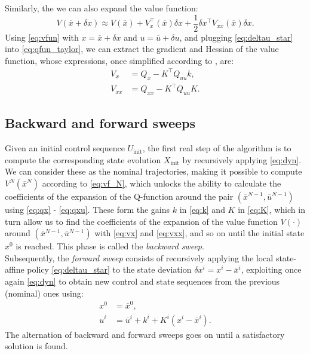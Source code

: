 Similarly, the we can also expand the value function:
\begin{equation*}
    V(\overline{x} + \delta x) \approx V(\overline{x}) + V_x^\top(\overline{x}) \delta x + \frac{1}{2} \delta x^\top V_{xx}(\overline{x}) \delta x.
\end{equation*}
Using \ref{eq:vfun} with $x = \overline{x}+ \delta x$ and $u = \overline{u} + \delta u$, and plugging \ref{eq:deltau_star} into \ref{eq:qfun_taylor}, we can extract the gradient and Hessian of the value function, whose expressions, once simplified according to \cite{tassa12}, are:
\begin{align}
    V_x &= Q_x - K^\top Q_{uu} k,\label{eq:vx} \\ 
    V_{xx} &= Q_{xx} - K^\top Q_{uu} K. \label{eq:vxx}
\end{align}

\subsection{Backward and forward sweeps}
Given an initial control sequence $U_{\text{init}}$, the first real step of the algorithm is to compute the corresponding state evolution $X_{\text{init}}$ by recursively applying \ref{eq:dyn}.\\
We can consider these as the nominal trajectories, making it possible to compute $V^N(\overline{x}^N)$ according to \ref{eq:vf_N}, which unlocks the ability to calculate the coefficients of the expansion of the Q-function around the pair $(\overline{x}^{N-1}, \overline{u}^{N-1})$ using \ref{eq:qx} - \ref{eq:qxu}. These form the gains $k$ in \ref{eq:k} and $K$ in \ref{eq:K}, which in turn allow us to find the coefficients of the expansion of the value function $V(\cdot)$ around $(\overline{x}^{N-1}, \overline{u}^{N-1})$ with \ref{eq:vx} and \ref{eq:vxx}, and so on until the initial state $x^0$ is reached. This phase is called the \textit{backward sweep}.\\
Subsequently, the \textit{forward sweep} consists of recursively applying the local state-affine policy \ref{eq:deltau_star} to the state deviation $\delta x^i = x^i - \overline{x}^i$, exploiting once again \ref{eq:dyn} to obtain new control and state sequences from the previous (nominal) ones using:
\begin{align}
    x^0 &= \overline{x}^0, \label{eq:x0} \\
    u^i &= \overline{u}^i + k^i + K^i (x^i - \overline{x}^i). \label{eq:u_update}
\end{align}
The alternation of backward and forward sweeps goes on until a satisfactory solution is found.

